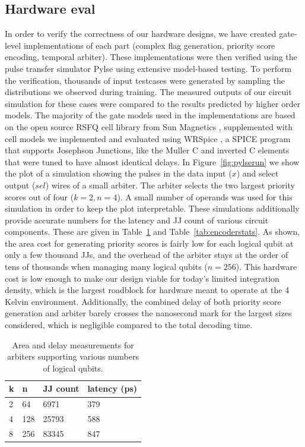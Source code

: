 \subsection{Hardware eval}
In order to verify the correctness of our hardware designs, we have created gate-level implementations of each part (complex flag generation, priority score encoding, temporal arbiter).
These implementations were then verified using the pulse transfer simulator Pylse \cite{pylse} using extensive model-based testing.
To perform the verification, thousands of input testcases were generated by sampling the distributions we observed during training.
The measured outputs of our circuit simulation for these cases were compared to the results predicted by higher order models.
The majority of the gate models used in the implementations are based on the open source RSFQ cell library from Sun Magnetics \cite{rsfqlib}, supplemented with cell models we implemented and evaluated using WRSpice \cite{wrspice}, a SPICE program that supports Josephson Junctions, like the Muller C and inverted C elements that were tuned to have almost identical delays.
In Figure~\ref{fig:pylserun} we show the plot of a simulation showing the pulses in the data input ($x$) and select output ($sel$) wires of a small arbiter.
The arbiter selects the two largest priority scores out of four ($k=2,n=4$).
A small number of operands was used for this simulation in order to keep the plot interpretable.
These simulations additionally provide accurate numbers for the latency and JJ count of various circuit components.
These are given in Table~\ref{tab:arbstats} and Table~\ref{tab:encoderstats}.
As shown, the area cost for generating priority scores is fairly low for each logical qubit at only a few thousand JJs, and the overhead of the arbiter stays at the order of tens of thousands when managing many logical qubits ($n=256$).
This hardware cost is low enough to make our design viable for today's limited integration density, which is the largest roadblock for hardware meant to operate at the 4 Kelvin environment.
Additionally, the combined delay of both priority score generation and arbiter barely crosses the nanosecond mark for the largest sizes considered, which is negligible compared to the total decoding time.



\begin{table}[]
\caption{Area and delay measurements for arbiters supporting various numbers of logical qubits.}
\label{tab:arbstats}
  \begin{tabularx}{\columnwidth}{|p{}|p{}|p{}|p{}|}
\hline
k & n   & JJ count & latency (ps) \\ \hline
2 & 64  & 6971     & 379          \\ \hline
4 & 128 & 25793    & 588          \\ \hline
8 & 256 & 83345    & 847          \\ \hline
\end{tabularx}
\vspace{-\baselineskip}
\end{table}

